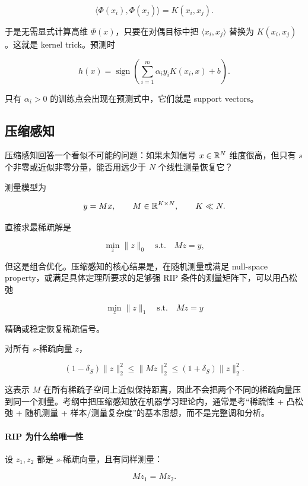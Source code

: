 \documentclass[11pt]{ctexart}
\begin{document}
\[
  \langle \Phi(x_i),\Phi(x_j)\rangle=K(x_i,x_j).
\]

于是无需显式计算高维 \(\Phi(x)\)，只要在对偶目标中把 \(\langle x_i,x_j\rangle\) 替换为 \(K(x_i,x_j)\)。这就是 kernel trick。预测时

\[
  h(x)
  =
  \operatorname{sign}
  \left(
    \sum_{i=1}^{m}
    \alpha_i y_i K(x_i,x)
    +
    b
  \right).
\]

只有 \(\alpha_i>0\) 的训练点会出现在预测式中，它们就是 support vectors。

\subsection{压缩感知}


压缩感知回答一个看似不可能的问题：如果未知信号 \(x\in\mathbb{R}^N\) 维度很高，但只有 \(s\) 个非零或近似非零分量，能否用远少于 \(N\) 个线性测量恢复它？

测量模型为

\[
  y=Mx,
  \qquad
  M\in\mathbb{R}^{K\times N},
  \qquad
  K\ll N.
\]

直接求最稀疏解是

\[
  \min_z \|z\|_0
  \quad
  \text{s.t.}
  \quad
  Mz=y,
\]

但这是组合优化。压缩感知的核心结果是，在随机测量或满足 null-space property，或满足具体定理所要求的足够强 RIP 条件的测量矩阵下，可以用凸松弛

\[
  \min_z \|z\|_1
  \quad
  \text{s.t.}
  \quad
  Mz=y
\]

精确或稳定恢复稀疏信号。\begin{definition}
对所有 \(s\)-稀疏向量 \(z\)，

\[
  (1-\delta_S)\|z\|_2^2
  \le
  \|Mz\|_2^2
  \le
  (1+\delta_S)\|z\|_2^2.
\]
\end{definition}

这表示 \(M\) 在所有稀疏子空间上近似保持距离，因此不会把两个不同的稀疏向量压到同一个测量。考纲中把压缩感知放在机器学习理论内，通常是考“稀疏性 + 凸松弛 + 随机测量 + 样本/测量复杂度”的基本思想，而不是完整调和分析。

\paragraph{RIP 为什么给唯一性}

设 \(z_1,z_2\) 都是 \(s\)-稀疏向量，且有同样测量：

\[
  Mz_1=Mz_2.
\]
\end{document}
